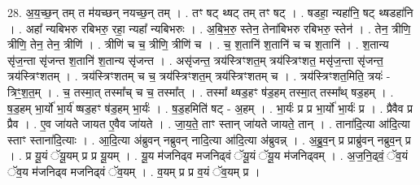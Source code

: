 \documentclass[17pt]{extarticle}
\begin{document}
28. अ॒य॒च्छ॒न् तम् त म॑यच्छन् नयच्छ॒न् तम् । . तꣳ षट् थ्षट् तम् तꣳ षट् । . षडहा॒ न्यहा॑नि॒ षट् थ्षडहा॑नि । . अहा᳚ न्यबिभरु रबिभरु॒ रहा॒ न्यहा᳚ न्यबिभरुः । . अ॒बि॒भ॒रु॒ स्तेन॒ तेना॑बिभरु रबिभरु॒ स्तेन॑ । . तेन॒ त्रीणि॒ त्रीणि॒ तेन॒ तेन॒ त्रीणि॑ । . त्रीणि॑ च च॒ त्रीणि॒ त्रीणि॑ च । . च॒ श॒तानि॑ श॒तानि॑ च च श॒तानि॑ । . श॒तान्य सृ॑ज॒न्ता सृ॑जन्त श॒तानि॑ श॒तान्य सृ॑जन्त । . असृ॑जन्त॒ त्रय॑स्त्रिꣳशत॒म् त्रय॑स्त्रिꣳशत॒ मसृ॑ज॒न्ता सृ॑जन्त॒ त्रय॑स्त्रिꣳशतम् । . त्रय॑स्त्रिꣳशतम् च च॒ त्रय॑स्त्रिꣳशत॒म् त्रय॑स्त्रिꣳशतम् च । . त्रय॑स्त्रिꣳशत॒मिति॒ त्रयः॑ - त्रिꣳ॒॒श॒त॒म् । . च॒ तस्मा॒त् तस्मा᳚च् च च॒ तस्मा᳚त् । . तस्मा᳚ थ्षड॒हꣳ ष॑ड॒हम् तस्मा॒त् तस्मा᳚थ् षड॒हम् । . ष॒ड॒हम् भा॒र्यो॑ भा॒र्य॑ ष्षड॒हꣳ ष॑ड॒हम् भा॒र्यः॑ । . ष॒ड॒हमिति॑ षट् - अ॒हम् । . भा॒र्यः॑ प्र प्र भा॒र्यो॑ भा॒र्यः॑ प्र । . प्रैवैव प्र प्रैव । . ए॒व जा॑यते जायत ए॒वैव जा॑यते । . जा॒य॒ते॒ ताꣳ स्तान् जा॑यते जायते॒ तान् । . ताना॑दि॒त्या आ॑दि॒त्या स्ताꣳ स्ताना॑दि॒त्याः । . आ॒दि॒त्या अ॑ब्रुवन् नब्रुवन् नादि॒त्या आ॑दि॒त्या अ॑ब्रुवन्न् । . अ॒ब्रु॒व॒न् प्र प्राब्रु॑वन् नब्रुव॒न् प्र । . प्र यू॒यं ॅयू॒यम् प्र प्र यू॒यम् । . यू॒य म॑जनिढ्व मजनिढ्वं ॅयू॒यं ॅयू॒य म॑जनिढ्वम् । . अ॒ज॒नि॒ढ्वं॒ ॅव॒यं ॅव॒य म॑जनिढ्व मजनिढ्वं ॅव॒यम् । . व॒यम् प्र प्र व॒यं ॅव॒यम् प्र । \newline
\end{document}
